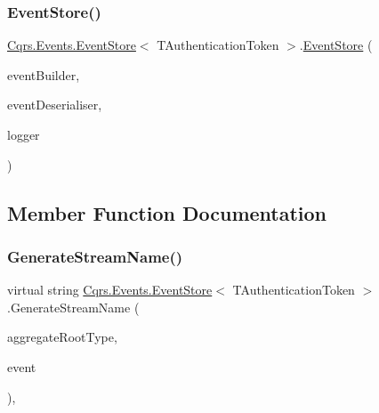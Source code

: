 \subsubsection{\texorpdfstring{Event\+Store()}{EventStore()}}
{\footnotesize\ttfamily \hyperlink{classCqrs_1_1Events_1_1EventStore}{Cqrs.\+Events.\+Event\+Store}$<$ T\+Authentication\+Token $>$.\hyperlink{classCqrs_1_1Events_1_1EventStore}{Event\+Store} (\begin{DoxyParamCaption}\item[{\hyperlink{interfaceCqrs_1_1Events_1_1IEventBuilder}{I\+Event\+Builder}$<$ T\+Authentication\+Token $>$}]{event\+Builder,  }\item[{\hyperlink{interfaceCqrs_1_1Events_1_1IEventDeserialiser}{I\+Event\+Deserialiser}$<$ T\+Authentication\+Token $>$}]{event\+Deserialiser,  }\item[{I\+Logger}]{logger }\end{DoxyParamCaption})\hspace{0.3cm}{\ttfamily [protected]}}



\subsection{Member Function Documentation}
\mbox{\label{classCqrs_1_1Events_1_1EventStore_a03df06d4ce9c6d16201c079f2de0a7f3_a03df06d4ce9c6d16201c079f2de0a7f3}} 
\subsubsection{\texorpdfstring{Generate\+Stream\+Name()}{GenerateStreamName()}\hspace{0.1cm}{\footnotesize\ttfamily [1/2]}}
{\footnotesize\ttfamily virtual string \hyperlink{classCqrs_1_1Events_1_1EventStore}{Cqrs.\+Events.\+Event\+Store}$<$ T\+Authentication\+Token $>$.Generate\+Stream\+Name (\begin{DoxyParamCaption}\item[{Type}]{aggregate\+Root\+Type,  }\item[{\hyperlink{interfaceCqrs_1_1Events_1_1IEvent}{I\+Event}$<$ T\+Authentication\+Token $>$ @}]{event }\end{DoxyParamCaption})\hspace{0.3cm}{\ttfamily [protected]}, {\ttfamily [virtual]}}

